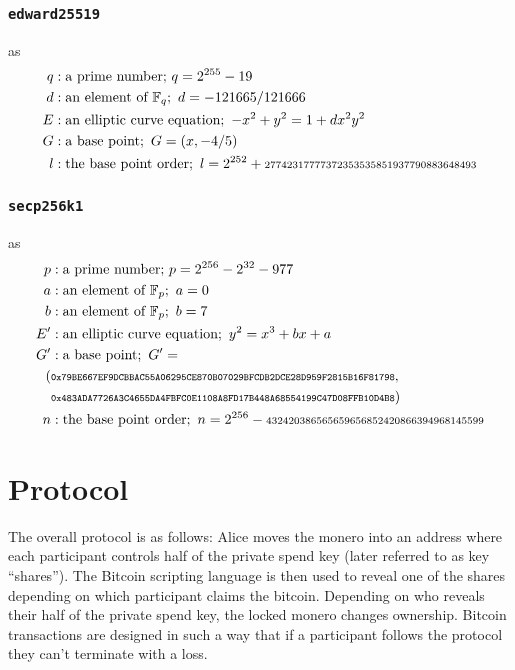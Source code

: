\documentclass{llncs}
\begin{document}
\subsubsection{\texttt{edward25519}} as
\begin{equation}
\begin{split}
    q&: \text{a prime number;}\ q = 2^{255} - 19 \\
    d&: \text{an element of } \mathbb{F}_q;\ d = - 121665/121666 \\
    E&: \text{an elliptic curve equation};\ -x^2 + y^2 = 1 + dx^2y^2 \\
    G&: \text{a base point};\ G = (x, -4/5) \\
    l&: \text{the base point order};\ l = 2^{252} + \text{\scriptsize27742317777372353535851937790883648493} \\
\end{split}
\end{equation}

\subsubsection{\texttt{secp256k1}} as
\begin{equation}
\begin{split}
    p&: \text{a prime number;}\ p = 2^{256} - 2^{32} - 977 \\
    a&: \text{an element of } \mathbb{F}_p;\ a = 0 \\
    b&: \text{an element of } \mathbb{F}_p;\ b = 7 \\
    E'&: \text{an elliptic curve equation};\ y^2 = x^3 + bx + a \\
    G'&: \text{a base point};\ G' = \\ (&\texttt{\scriptsize0x79BE667EF9DCBBAC55A06295CE870B07029BFCDB2DCE28D959F2815B16F81798},\\ &\texttt{\scriptsize0x483ADA7726A3C4655DA4FBFC0E1108A8FD17B448A68554199C47D08FFB10D4B8}) \\
    n&: \text{the base point order};\ n = 2^{256} - \text{\scriptsize{432420386565659656852420866394968145599}} \\
\end{split}
\end{equation}

\section{Protocol}

The overall protocol is as follows: Alice moves the monero into an address where each participant controls half of the private spend key (later referred to as key ``shares''). The Bitcoin scripting language is then used to reveal one of the shares depending on which participant claims the bitcoin. Depending on who reveals their half of the private spend key, the locked monero changes ownership. Bitcoin transactions are designed in such a way that if a participant follows the protocol they can't terminate with a loss.
\end{document}

